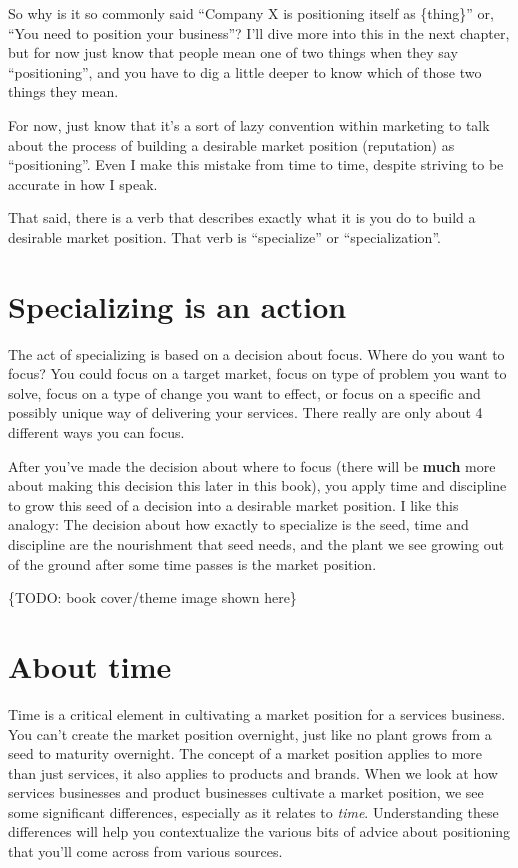 So why is it so commonly said ``Company X is positioning itself as \{thing\}'' or, ``You need to position your business''?  I'll dive more into this in the next chapter, but for now just know that people mean one of two things when they say ``positioning'', and you have to dig a little deeper to know which of those two things they mean.

For now, just know that it's a sort of lazy convention within marketing to talk about the process of building a desirable market position (reputation) as ``positioning''. Even I make this mistake from time to time, despite striving to be accurate in how I speak.

That said, there is a verb that describes exactly what it is you do to build a desirable market position. That verb is ``specialize'' or ``specialization''.

\section{Specializing is an action}

The act of specializing is based on a decision about focus. Where do you want to focus? You could focus on a target market, focus on type of problem you want to solve, focus on a type of change you want to effect, or focus on a specific and possibly unique way of delivering your services.  There really are only about 4 different ways you can focus.

After you've made the decision about where to focus (there will be \textbf{much} more about making this decision this later in this book), you apply time and discipline to grow this seed of a decision into a desirable market position. I like this analogy: The decision about how exactly to specialize is the seed, time and discipline are the nourishment that seed needs, and the plant we see growing out of the ground after some time passes is the market position.

\{TODO: book cover/theme image shown here\}

\section{About time}

Time is a critical element in cultivating a market position for a services business. You can't create the market position overnight, just like no plant grows from a seed to maturity overnight. The concept of a market position applies to more than just services, it also applies to products and brands. When we look at how services businesses and product businesses cultivate a market position, we see some significant differences, especially as it relates to \emph{time}. Understanding these differences will help you contextualize the various bits of advice about positioning that you'll come across from various sources.

